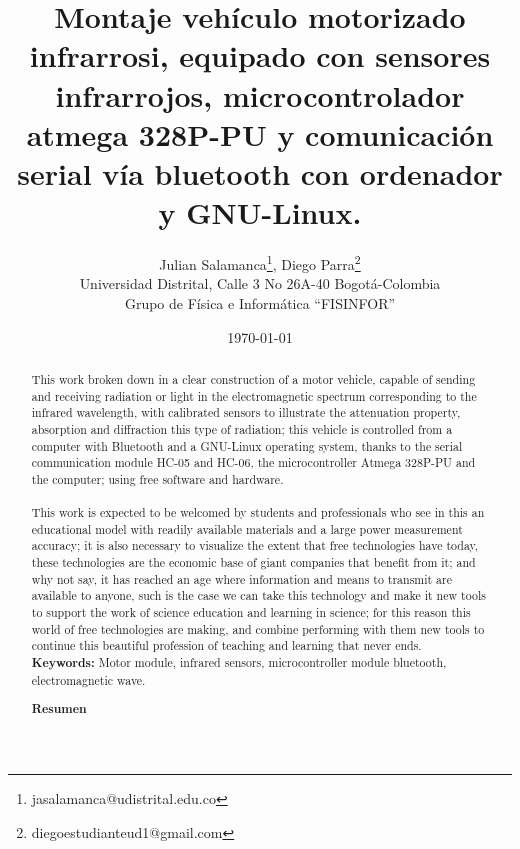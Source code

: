 \documentclass[12]{article}
\title{\bf{Montaje vehículo motorizado infrarrosi, equipado con sensores infrarrojos, microcontrolador atmega 328P-PU y comunicación serial vía bluetooth con ordenador y GNU-Linux.}}
\author{Julian Salamanca\footnote{jasalamanca@udistrital.edu.co}, Diego Parra\footnote{diegoestudianteud1@gmail.com} \\
  Universidad Distrital, Calle 3 No 26A-40 Bogotá-Colombia\\
  Grupo de Física e Informática ``FISINFOR''
}
\date{\today}
\def\tablename{Tabla}%
\begin{document}
\renewcommand{\tablename}{Tabla}
\maketitle
\vspace{-0.8cm}

\begin{abstract}
This work broken down in a clear construction of a motor vehicle, capable of sending and receiving radiation or light in the electromagnetic spectrum corresponding to the infrared wavelength, with calibrated sensors to illustrate the attenuation property, absorption and diffraction this type of radiation; this vehicle is controlled from a computer with Bluetooth and a GNU-Linux operating system, thanks to the serial communication module HC-05 and HC-06, the microcontroller Atmega 328P-PU and the computer; using free software and hardware.\\ \\
This work is expected to be welcomed by students and professionals who see in this an educational model with readily available materials and a large power measurement accuracy; it is also necessary to visualize the extent that free technologies have today, these technologies are the economic base of giant companies that benefit from it; and why not say, it has reached an age where information and means to transmit are available to anyone, such is the case we can take this technology and make it new tools to support the work of science education and learning in science; for this reason this world of free technologies are making, and combine performing with them new tools to continue this beautiful profession of teaching and learning that never ends.\\ 
{\bf{Keywords:}} Motor module, infrared sensors, microcontroller module bluetooth, electromagnetic wave.


\begin{center}
{\bf{Resumen}} 
\end{center}


\end{abstract}
\end{document}
